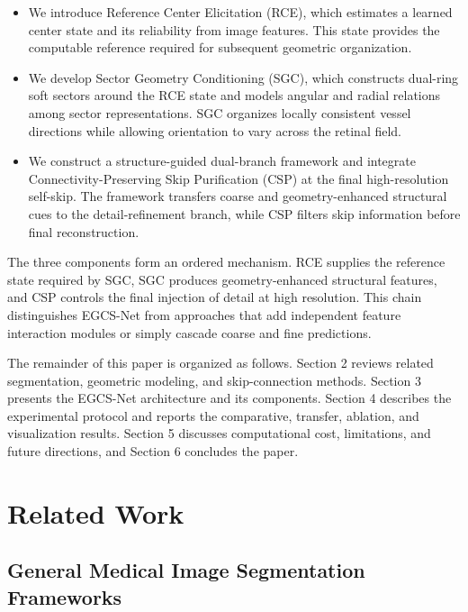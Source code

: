 \documentclass[a4paper,fleqn]{cas-sc}
\begin{document}
\begin{itemize}[label=\textbf{\textbullet}]
    \item We introduce Reference Center Elicitation (RCE), which estimates a learned center state and its reliability from image features. This state provides the computable reference required for subsequent geometric organization.

    \item We develop Sector Geometry Conditioning (SGC), which constructs dual-ring soft sectors around the RCE state and models angular and radial relations among sector representations. SGC organizes locally consistent vessel directions while allowing orientation to vary across the retinal field.

    \item We construct a structure-guided dual-branch framework and integrate Connectivity-Preserving Skip Purification (CSP) at the final high-resolution self-skip. The framework transfers coarse and geometry-enhanced structural cues to the detail-refinement branch, while CSP filters skip information before final reconstruction.
\end{itemize}

The three components form an ordered mechanism.
RCE supplies the reference state required by SGC, SGC produces geometry-enhanced structural features, and CSP controls the final injection of detail at high resolution.
This chain distinguishes EGCS-Net from approaches that add independent feature interaction modules or simply cascade coarse and fine predictions.

The remainder of this paper is organized as follows.
Section 2 reviews related segmentation, geometric modeling, and skip-connection methods.
Section 3 presents the EGCS-Net architecture and its components.
Section 4 describes the experimental protocol and reports the comparative, transfer, ablation, and visualization results.
Section 5 discusses computational cost, limitations, and future directions, and Section 6 concludes the paper.

\section{Related Work}
\label{related_work}

\subsection{General Medical Image Segmentation Frameworks}
\end{document}
